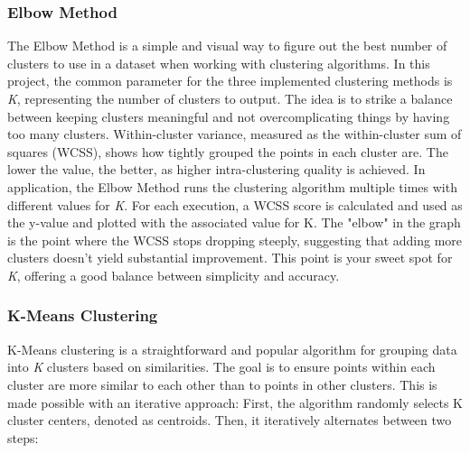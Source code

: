 \documentclass[11pt]{article}
\begin{document}
\vspace{1\baselineskip}
\subsubsection{Elbow Method}

The Elbow Method is a simple and visual way to figure out the best number of clusters to use in a dataset when working with clustering algorithms. In this project, the common parameter for the three implemented clustering methods is \textit{K}, representing the number of clusters to output. The idea is to strike a balance between keeping clusters meaningful and not overcomplicating things by having too many clusters. Within-cluster variance, measured as the within-cluster sum of squares (WCSS), shows how tightly grouped the points in each cluster are. The lower the value, the better, as higher intra-clustering quality is achieved. In application, the Elbow Method runs the clustering algorithm multiple times with different values for \textit{K}. For each execution, a WCSS score is calculated and used as the y-value and plotted with the associated value for K. The "elbow" in the graph is the point where the WCSS stops dropping steeply, suggesting that adding more clusters doesn't yield substantial improvement. This point is your sweet spot for \textit{K}, offering a good balance between simplicity and accuracy.

\vspace{1\baselineskip}
\subsubsection{K-Means Clustering}

K-Means clustering is a straightforward and popular algorithm for grouping data into \textit{K} clusters based on similarities. The goal is to ensure points within each cluster are more similar to each other than to points in other clusters. This is made possible with an iterative approach: First, the algorithm randomly selects K cluster centers, denoted as centroids. Then, it iteratively alternates between two steps:
\end{document}
